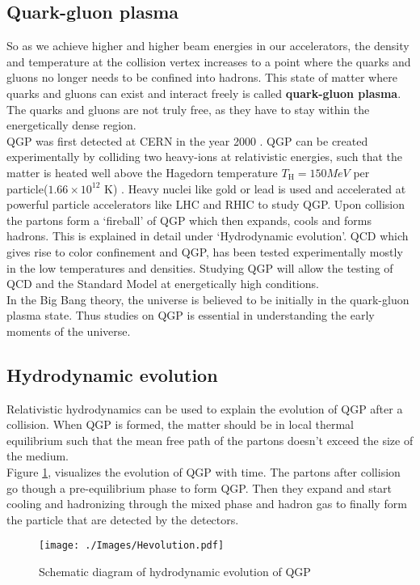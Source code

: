 \documentclass[12pt,a4paper,twoside]{report}
\begin{document}
\subsection{Quark-gluon plasma}
So as we achieve higher and higher beam energies in our accelerators, the density and temperature at the collision vertex increases to a point where the quarks and gluons no longer needs to be confined into hadrons. This state of matter where quarks and gluons can exist and interact freely is called \textbf{quark-gluon plasma}. The quarks and gluons are not truly free, as they have to stay within the energetically dense region.\\

QGP was first detected at CERN in the year 2000 \cite{Ref:QGP-discovery}. QGP can be created experimentally by colliding two heavy-ions at relativistic energies, such that the matter is heated well above the Hagedorn temperature $T_\mathrm{H}=150MeV$ per particle($1.66\times10^{12}$ K) \cite{Ref:Hagedorn}. Heavy nuclei like gold or lead is used and accelerated at powerful particle accelerators like LHC and RHIC to study QGP. Upon collision the partons form a `fireball' of QGP which then expands, cools and forms hadrons. This is explained in detail under `Hydrodynamic evolution'.
QCD which gives rise to color confinement and QGP, has been tested experimentally mostly in the low temperatures and densities. Studying QGP will allow the testing of QCD and the Standard Model at energetically high conditions.\\
In the Big Bang theory, the universe is believed to be initially in the quark-gluon plasma state. Thus studies on QGP is essential in understanding the 
early moments of the universe.
\subsection{Hydrodynamic evolution}
Relativistic hydrodynamics can be used to explain the evolution of QGP after a collision. When QGP is formed, the matter should be in local thermal equilibrium such that the mean free path of the partons doesn't exceed the size of the medium.\\

Figure \ref{fig:hydrodynamics}, visualizes the evolution of QGP with time. The partons after collision go though a pre-equilibrium phase to form QGP. Then they expand and start cooling and hadronizing through the mixed phase and hadron gas to finally form the particle that are detected by the detectors.
\begin{figure}[H]
	\centering
	\texttt{[image: ./Images/Hevolution.pdf]}
	\caption{\label{fig:hydrodynamics}Schematic diagram of hydrodynamic evolution of QGP}
\end{figure}
\end{document}
